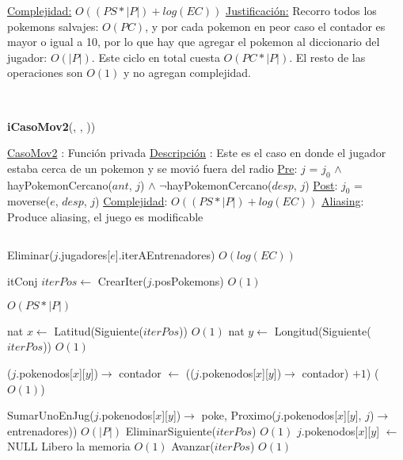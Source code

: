 \begin{Algoritmos}
\begin{algorithmic}[1]
\medskip
\Statex \underline{Complejidad:} $O((PS *|P|) + log(EC))$ 
\Statex \underline{Justificaci\'on:} Recorro todos los pokemons salvajes: $O(PC)$, y por cada pokemon en peor caso el contador es mayor o igual a 10, por lo que hay que agregar el pokemon al diccionario del jugador: $O(|P|)$. Este ciclo en total cuesta $O(PC*|P|)$. El resto de las operaciones son $O(1)$ y no agregan complejidad. 
\end{algorithmic}

$ $\newline
$ $\newline


{\textbf{iCasoMov2}(,  , ))}
\begin{algorithmic}[1]

\Statex \underline{CasoMov2} : Funci\'on privada 
\Statex \underline{Descripci\'on} : Este es el caso en donde el jugador estaba cerca de un pokemon y se movi\'o fuera del radio
\Statex \underline{Pre}: $j$ = $j_0$ $\land$ hayPokemonCercano($ant$, $j$) $\land$ $\neg$hayPokemonCercano($desp$, $j$) 
\Statex \underline{Post}: $j_0$ = moverse($e$, $desp$, $j$) 
\Statex \underline{Complejidad}:  $O((PS *|P|) + log(EC))$ 
\Statex \underline{Aliasing}: Produce aliasing, el juego es modificable

$ $\newline

\State Eliminar($j$.jugadores[$e$].iterAEntrenadores) \Comment $O(log(EC))$

\State itConj $iterPos \gets$ CrearIter($j$.posPokemons) \Comment $O(1)$ 

  \Comment $O(PS * |P|)$

  \State nat $x \gets$ Latitud(Siguiente($iterPos$)) \Comment $O(1)$
  \State nat $y \gets$ Longitud(Siguiente($iterPos$)) \Comment $O(1)$   
  
  \State ($j$.pokenodos[$x$][$y$])$\rightarrow$ contador $\gets$ (($j$.pokenodos[$x$][$y$])$\rightarrow$ contador) $+ 1$) \Comment($O(1)$)
  
    \State SumarUnoEnJug($j$.pokenodos[$x$][$y$])$\rightarrow$ poke, Proximo($j$.pokenodos[$x$][$y$], $j$)$\rightarrow$ entrenadores)) \Comment $O(|P|)$
    \State EliminarSiguiente($iterPos$) \Comment $O(1)$
    \State $j$.pokenodos[$x$][$y$] $\gets$ NULL \Comment Libero la memoria $O(1)$
  \Else 
    \State Avanzar($iterPos$) \Comment $O(1)$ 
  \EndIf


\end{algorithmic}
\end{Algoritmos}
